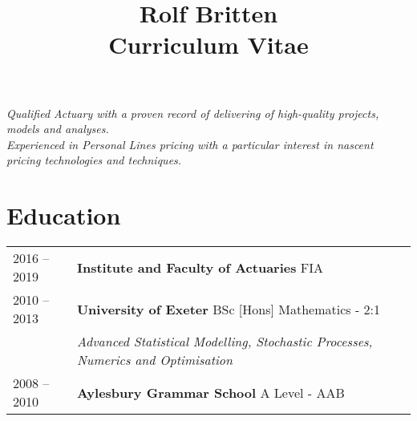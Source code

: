 \documentclass[11pt]{article}
\title{\bfseries \Huge Rolf Britten \\ \Large Curriculum Vitae}
\date{}
\begin{document}
\vspace{-20mm}
\maketitle
\vspace{-20mm}

\begin{center} \emph{ Qualified Actuary with a proven record of delivering of high-quality projects, models and analyses.\\Experienced in Personal Lines pricing with a particular interest in nascent pricing technologies and techniques.} \end{center}

\section*{Education}
\begin{tabular}{l | l l}
2016 -- 2019 & \textbf{Institute and Faculty of Actuaries} FIA \\
2010 -- 2013 & \textbf{University of Exeter} BSc [Hons] Mathematics - 2:1\\
& \hspace{4mm} \textit{Advanced Statistical Modelling, Stochastic Processes, Numerics and Optimisation }\\
2008 -- 2010 & \textbf{Aylesbury Grammar School} A Level - AAB \\
\end{tabular}
\end{document}
